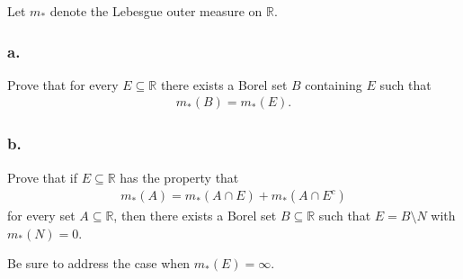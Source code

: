 Let \(m_*\) denote the Lebesgue outer measure on \({\mathbb{R}}\).

\hypertarget{a.}{%
\subsubsection{a.}\label{a.}}

Prove that for every \(E\subseteq {\mathbb{R}}\) there exists a Borel
set \(B\) containing \(E\) such that
\begin{align*}
m_*(B) = m_*(E)
.\end{align*}

\hypertarget{b.}{%
\subsubsection{b.}\label{b.}}

Prove that if \(E\subseteq {\mathbb{R}}\) has the property that
\begin{align*}
m_*(A) = m_*(A\cap E) + m_*(A\cap E^c)
\end{align*}
for every set \(A\subseteq {\mathbb{R}}\), then there exists a Borel set
\(B\subseteq {\mathbb{R}}\) such that \(E = B\setminus N\) with
\(m_*(N) = 0\).

Be sure to address the case when \(m_*(E) = \infty\).

